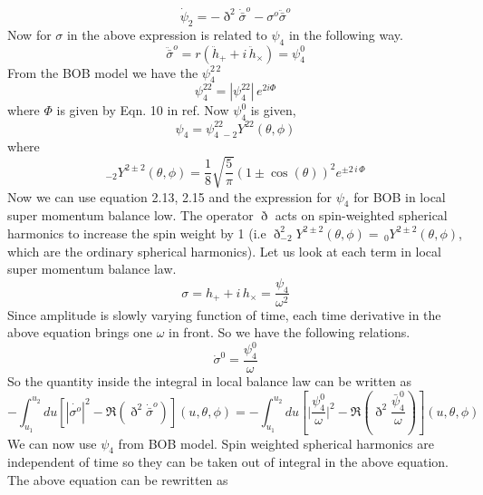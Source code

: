 \documentclass[prd,preprintnumbers,onecolumn,eqsecnum,floatfix,letter]{revtex4}
\begin{document}
\begin{equation}
	\dot{\psi}_2 = - \eth^{2}\dot{\bar{\sigma}}^{o} - {\sigma}^{o}\ddot{\bar{\sigma}}^{o}
\end{equation}
Now for $\sigma$ in the above expression is related to $\psi_4$ in the following way.
\begin{equation}
	\ddot{\bar{\sigma}}^{o} = r\left(\ddot{h}_{+} + i\, \ddot{h}_{\times}  \right)
	\label{psi4} = \psi_{4}^{0}
\end{equation} 
From the BOB model we have the $\psi_{4}^{2\,2}$ 
\begin{equation}
	\psi_{4}^{22} = |\psi_{4}^{22}|\, e^{2i\Phi}
\end{equation}
where $\Phi$ is given by Eqn. 10 in ref\cite{McWilliams_2019}. Now $\psi_{4}^{0}$ is given,
\begin{equation}
	\psi_{4} = \psi^{22}_{4\,\,-2}Y^{22}(\theta, \phi)
\end{equation}
where
\begin{equation}
	_{-2}Y^{2\pm 2}(\theta,\phi) = \frac{1}{8}\sqrt{\frac{5}{\pi}}\left(1 \pm \cos(\theta)\right)^{2}e^{\pm 2\,i\,\Phi}
\end{equation}
Now we can use equation 2.13, 2.15 and the expression for $\psi_{4}$ for BOB in local super momentum balance low. The operator $\eth$ acts on spin-weighted spherical harmonics to increase the spin weight by 1 (i.e $\eth^2 _{-2}Y^{2\pm 2}(\theta,\phi) = \,_{0}Y^{2\pm 2}(\theta,\phi)$, which are the ordinary spherical harmonics). Let us look at each term in local super momentum balance law.
\begin{equation}
	\sigma = h_{+} + i\,h_{\times} = \frac{\psi_{4}}{\omega^2}
\end{equation}   
Since amplitude is slowly varying function of time, each time derivative in the above equation brings one $\omega$ in front. So we have the following relations.
\begin{equation}
	\dot{\sigma}^{0} = \frac{\psi_{4}^{0}}{\omega} 
\end{equation}
So the quantity inside the integral in local balance law can be written as
\begin{equation}
	-\int_{u_{1}}^{u_{2}} du \left[|\dot{\sigma^{o}}|^{2} - \Re\left(\eth^{2}\dot{\bar{\sigma}}^{o} \right) \right](u, \theta, \phi) = -\int_{u_{1}}^{u_{2}} du \left[\bigg|\frac{\psi_{4}^{0}}{\omega}\bigg|^{2} - \Re\left(\eth^{2}\frac{\bar{\psi}_{4}^{0}}{\omega} \right) \right](u, \theta, \phi)
\end{equation}
We can now use $\psi_{4}$ from BOB model. Spin weighted spherical harmonics are independent of time so they can be taken out of integral in the above equation. The above equation can be rewritten as 
\end{document}
